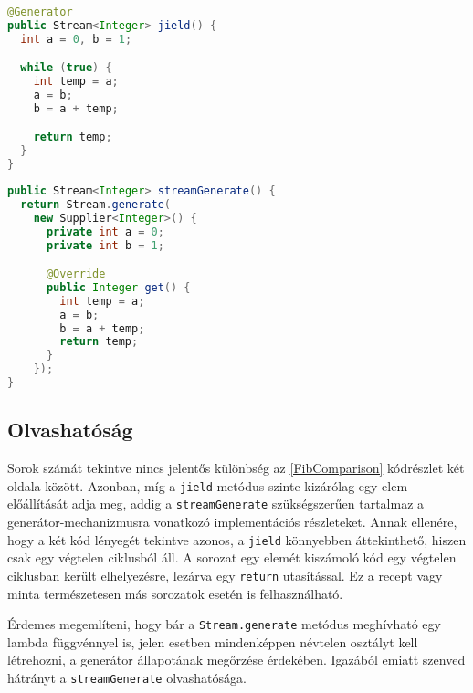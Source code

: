 \begin{center}
\begin{mdframed}[topline=true]
\begin{minipage}[t]{0.45\textwidth}
\begin{lstlisting}[language=Java, breaklines=true, escapechar=!]
@Generator
public Stream<Integer> jield() {
  int a = 0, b = 1;

  while (true) {
    int temp = a;
    a = b;
    b = a + temp;

    return temp;
  }
}
\end{lstlisting}
\end{minipage} 
\begin{minipage}[t]{0.55\textwidth}
\begin{lstlisting}[language=Java, breaklines=true, escapechar=!]
public Stream<Integer> streamGenerate() {
  return Stream.generate(
    new Supplier<Integer>() {
      private int a = 0;
      private int b = 1;

      @Override
      public Integer get() {
        int temp = a;
        a = b;
        b = a + temp;
        return temp;
      }
    });
}
\end{lstlisting} 
\end{minipage}
\end{mdframed}
\label{FibComparison}
\end{center}

\subsection{Olvashatóság}

Sorok számát tekintve nincs jelentős különbség az \ref{FibComparison} kódrészlet két oldala között. Azonban, míg a \texttt{jield} metódus szinte kizárólag egy elem előállítását adja meg, addig a \texttt{streamGenerate} szükségszerűen tartalmaz a generátor-mechanizmusra vonatkozó implementációs részleteket. Annak ellenére, hogy a két kód lényegét tekintve azonos, a \texttt{jield} könnyebben áttekinthető, hiszen csak egy végtelen ciklusból áll. A sorozat egy elemét kiszámoló kód egy végtelen ciklusban került elhelyezésre, lezárva egy \texttt{return} utasítással. Ez a recept vagy minta természetesen más sorozatok esetén is felhasználható.

Érdemes megemlíteni, hogy bár a \texttt{Stream.generate} metódus meghívható egy lambda függvénnyel is, jelen esetben mindenképpen névtelen osztályt kell létrehozni, a generátor állapotának megőrzése érdekében. Igazából emiatt szenved hátrányt a \texttt{streamGenerate} olvashatósága.

